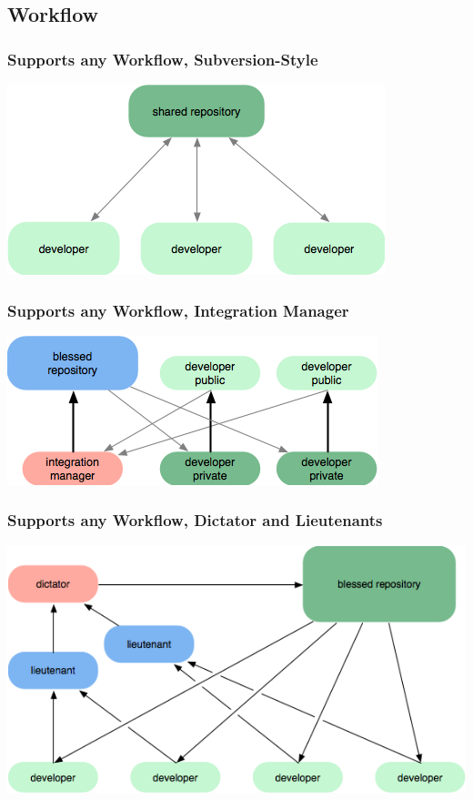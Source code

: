 \documentclass{beamer}
\begin{document}
    \subsection{Workflow}
		\begin{frame}
			\frametitle{Supports any Workflow, Subversion-Style}
			\begin{center}
				\includegraphics[scale=1]{images/fact4_1}
			\end{center}
		\end{frame}	

		\begin{frame}
			\frametitle{Supports any Workflow, Integration Manager}
			\begin{center}
				\includegraphics[scale=1]{images/fact4_2}
			\end{center}
		\end{frame}	
		
		\begin{frame}
			\frametitle{Supports any Workflow, Dictator and Lieutenants}
			\begin{center}
				\includegraphics[scale=1]{images/fact4_3}
			\end{center}
		\end{frame}	
\end{document}
